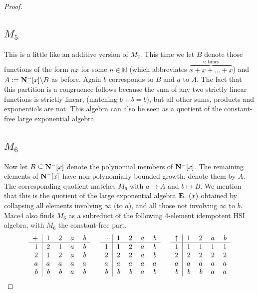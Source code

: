 \documentclass[eqnor,reqno]{amsart}
\theoremstyle{plain}
\theoremstyle{definition}
\begin{document}
\begin{proof}
\subsection{$M_5$} This is a little like an additive version of $M_2$.  
This time we let $B$ denote those functions of the form $nx$ for some $n\in\mathbb{N}$ (which abbreviates $\overbrace{x+x+\dots+x}^{n\text{ times}}$) and $A:={\bf N}^-[x]\backslash B$ as before.  
Again $b$ corresponds to $B$ and $a$ to $A$.  
The fact that this partition is a congruence follows because the sum of any two strictly linear functions is strictly linear, (matching $b+b=b$), but all other sums, products and exponentials are not.
This algebra can also be seen as a quotient of the constant-free large exponential algebra.

\subsection{$M_6$} Now let $B\subseteq {\bf N}^-[x]$ denote the polynomial members of ${\bf N}^-[x]$.  The remaining elements of ${\bf N}^-[x]$ have non-polynomially bounded growth; denote them by $A$.  
The corresponding quotient matches $M_6$ with $a\mapsto A$ and $b\mapsto B$.  
We mention that this is the quotient of the large exponential algebra ${\bf E}_-(x)$ obtained by collapsing all elements involving $\infty$ (to $a$), and all those not involving $\infty$ to $b$.
Mace4 also finds $M_6$ as a subreduct of the following $4$-element idempotent HSI algebra, with $M_6$ the constant-free part.
\[
\begin{tabular}{r|rrrr}
$+$ & $1$ & $2$ & $a$ & $b$\\
\hline
    $1$ & $2$ & $1$ & $a$ & $b$ \\
    $2$ & $1$ & $2$ & $a$ & $b$ \\
    $a$ & $a$ & $a$ & $a$ & $a$ \\
    $b$ & $b$ & $b$ & $a$ & $b$
\end{tabular} \hspace{.5cm}
\begin{tabular}{r|rrrr}
$\cdot$ & $1$ & $2$ & $a$ & $b$\\
\hline
    $1$ & $1$ & $2$ & $a$ & $b$ \\
    $2$ & $2$ & $2$ & $a$ & $b$ \\
    $a$ & $a$ & $a$ & $a$ & $a$ \\
    $b$ & $b$ & $b$ & $a$ & $b$
\end{tabular} \hspace{.5cm}
\begin{tabular}{r|rrrr}
$\uparrow$ & $1$ & $2$ & $a$ & $b$\\
\hline
    $1$ & $1$ & $1$ & $1$ & $1$ \\
    $2$ & $2$ & $2$ & $2$ & $2$ \\
    $a$ & $a$ & $a$ & $a$ & $a$ \\
    $b$ & $b$ & $b$ & $a$ & $a$
\end{tabular}\]


\end{proof}
\end{document}

